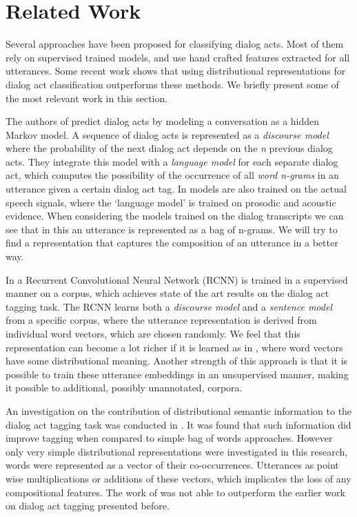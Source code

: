 \section{Related Work}\label{sec:relwork}
Several approaches have been proposed for classifying dialog acts. Most of them rely on supervised trained models, and use hand crafted features extracted for all utterances.  Some recent work shows that using distributional representations for dialog act classification outperforms these methods. We briefly present some of the most relevant work in this section.

The authors of \cite{stolcke2000} predict dialog acts by modeling a conversation as a hidden Markov model. A sequence of dialog acts is represented as a \emph{discourse model} where the probability of the next dialog act depends on the \emph{n} previous dialog acts. They integrate this model with a \emph{language model} for each separate dialog act, which computes the possibility of the occurrence of all \emph{word n-grams} in an utterance given a certain dialog act tag. In \cite{stolcke2000} models are also trained on the actual speech signals, where the `language model' is trained on prosodic and acoustic evidence. When considering the models trained on the dialog transcripts we can see that in this an utterance is represented as a bag of n-grams. We will try to find a representation that captures the composition of an utterance in a better way.


In \cite{kalchbrenner} a Recurrent Convolutional Neural Network (RCNN) is trained in a supervised manner on a corpus, which achieves state of the art results on the dialog act tagging task. The RCNN learns both a \emph{discourse model} and a \emph{sentence model} from a specific corpus, where the utterance representation is derived from individual word vectors, which are chosen randomly. We feel that this representation can become a lot richer if it is learned as in \cite{le2014distributed}, where word vectors have some distributional meaning. Another strength of this approach is that it is possible to train these utterance embeddings in an unsupervised manner, making it possible to additional, possibly unannotated, corpora. 

An investigation on the contribution of distributional semantic information to the dialog act tagging task was conducted in \cite{milajevs}. It was found that such information did improve tagging when compared to simple bag of words approaches. However only very simple distributional representations were investigated in this research, words were represented as a vector of their co-occurrences. Utterances as point wise multiplications or additions of these vectors, which implicates the loss of any compositional features. The work of \cite{milajevs} was not able to outperform the earlier work on dialog act tagging presented before. 

